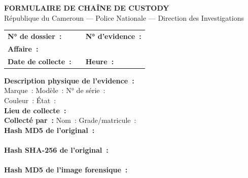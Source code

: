 \begin{boxcustody}
\begin{center}
{\bfseries\color{CouleurPrimaire} FORMULAIRE DE CHAÎNE DE CUSTODY}\\[0.5ex]
{\small République du Cameroun --- Police Nationale --- Direction des Investigations}
\end{center}
\vspace{0.5ex}
\begin{tabular}{p{4cm}p{3.5cm}p{4cm}}
\textbf{N° de dossier~:} & \underline{\hspace{3cm}} &
\textbf{N° d'evidence~:} \underline{\hspace{2cm}} \\[0.6ex]
\textbf{Affaire~:} & \multicolumn{2}{l}{\underline{\hspace{7cm}}} \\[0.6ex]
\textbf{Date de collecte~:} & \underline{\hspace{3cm}} &
\textbf{Heure~:} \underline{\hspace{2cm}} \\[0.6ex]
\end{tabular}
\vspace{0.5ex}
\textbf{Description physique de l'evidence~:}\\
Marque~: \underline{\hspace{3.5cm}}
Modèle~: \underline{\hspace{3.5cm}}
N° de série~: \underline{\hspace{3.5cm}}\\
Couleur~: \underline{\hspace{3cm}}
État~: \underline{\hspace{5cm}} \\[0.5ex]
\textbf{Lieu de collecte~:} \underline{\hspace{6cm}}\\[0.5ex]
\textbf{Collecté par~:} Nom~: \underline{\hspace{3cm}}
Grade/matricule~: \underline{\hspace{3cm}}\\[0.5ex]
\textbf{Hash MD5 de l'original~:}\\
\texttt{\underline{\hspace{10cm}}}\\[0.3ex]
\textbf{Hash SHA-256 de l'original~:}\\
\texttt{\underline{\hspace{10cm}}}\\[0.5ex]
\textbf{Hash MD5 de l'image forensique~:}\\

\end{boxcustody}
